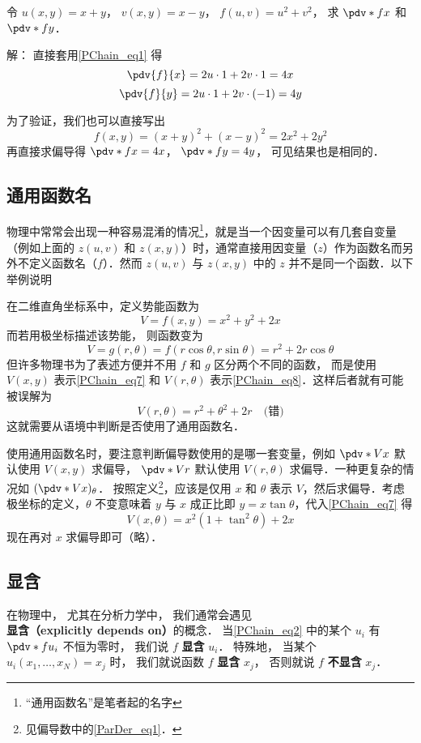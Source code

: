 \begin{example}{}
令 $u(x,y) = x + y$， $v(x,y) = x - y$， $f(u, v) = u^2 + v^2$， 求 $\pdv*{f}{x}$ 和 $\pdv*{f}{y}$．

解： 直接套用\autoref{PChain_eq1} 得
\begin{equation}
\pdv{f}{x} = 2u \cdot 1 + 2v \cdot 1 = 4x
\end{equation}
\begin{equation}
\pdv{f}{y} = 2u \cdot 1 + 2v \cdot (-1) = 4y
\end{equation}

为了验证，我们也可以直接写出
\begin{equation}
f(x, y) = (x+y)^2 + (x-y)^2 = 2x^2 + 2y^2
\end{equation}
再直接求偏导得 $\pdv*{f}{x} = 4x$， $\pdv*{f}{y} = 4y$， 可见结果也是相同的．
\end{example}

\subsection{通用函数名}
物理中常常会出现一种容易混淆的情况\footnote{“通用函数名”是笔者起的名字}，就是当一个因变量可以有几套自变量（例如上面的 $z(u,v)$ 和 $z(x,y)$）时，通常直接用因变量（$z$）作为函数名而另外不定义函数名（$f$）．然而 $z(u,v)$ 与 $z(x,y)$ 中的 $z$ 并不是同一个函数．以下举例说明

\begin{example}{}\label{PChain_ex1}
在二维直角坐标系中，定义势能函数为
\begin{equation}\label{PChain_eq7}
V=f(x,y)=x^2+y^2+2x
\end{equation}
而若用极坐标描述该势能， 则函数变为
\begin{equation}\label{PChain_eq8}
V = g(r,\theta) = f(r\cos \theta , r\sin \theta ) = r^2 + 2r\cos \theta
\end{equation}
但许多物理书为了表述方便并不用 $f$ 和 $g$ 区分两个不同的函数， 而是使用 $V(x,y)$ 表示\autoref{PChain_eq7} 和 $V(r,\theta)$ 表示\autoref{PChain_eq8}．这样后者就有可能被误解为
\begin{equation}
V(r,\theta) = r^2+\theta^2+2r \quad \text{(错)}
\end{equation}
这就需要从语境中判断是否使用了通用函数名．

使用通用函数名时，要注意判断偏导数使用的是哪一套变量，例如 $\pdv*{V}{x}$ 默认使用 $V(x,y)$ 求偏导， $\pdv*{V}{r}$ 默认使用 $V(r,\theta)$ 求偏导．一种更复杂的情况如 $(\pdv*{V}{x})_\theta$． 按照定义\footnote{见偏导数中的\autoref{ParDer_eq1}．}，应该是仅用 $x$ 和 $\theta$ 表示 $V$，然后求偏导．考虑极坐标的定义，$\theta$ 不变意味着 $y$ 与 $x$ 成正比即 $y=x\tan\theta$，代入\autoref{PChain_eq7} 得
\begin{equation}
V(x,\theta)=x^2(1+\tan^2 \theta) + 2x
\end{equation}
现在再对 $x$ 求偏导即可（略）．
\end{example}

\subsection{显含}
在物理中， 尤其在分析力学中， 我们通常会遇见\textbf{显含（explicitly depends on）}的概念． 当\autoref{PChain_eq2} 中的某个 $u_i$ 有 $\pdv*{f}{u_i}$ 不恒为零时， 我们说 $f$ \textbf{显含} $u_i$． 特殊地， 当某个 $u_i(x_1, \dots, x_N) = x_j$ 时， 我们就说函数 $f$ \textbf{显含} $x_j$， 否则就说 $f$ \textbf{不显含} $x_j$．

